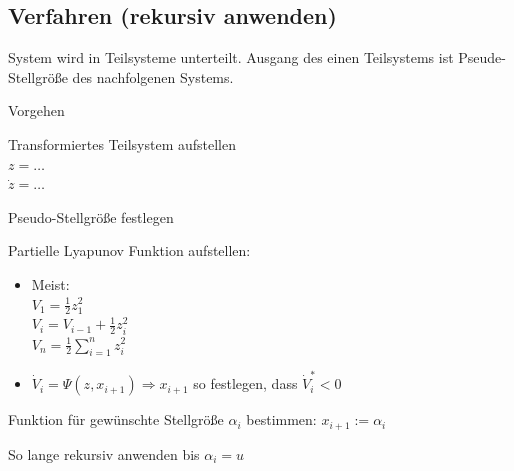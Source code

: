 \documentclass[german]{latex4ei/latex4ei_sheet}
\begin{document}
\begin{sectionbox}
\subsection{Verfahren (rekursiv anwenden)}
System wird in Teilsysteme unterteilt. Ausgang des einen Teilsystems ist Pseude-Stellgröße des nachfolgenen Systems.

\begin{cookbox}{Vorgehen}
  \item Transformiertes Teilsystem aufstellen\\
    $z = \dots$\\
    $\dot{z} = \dots$
  \item Pseudo-Stellgröße festlegen
  \item Partielle Lyapunov Funktion aufstellen:
    \begin{itemize}
      \item  Meist:\\
        $V_1 = \frac{1}{2} z_1^2$\\
        $V_i = V_{i-1} + \frac{1}{2}z_i^2$ \\
        $V_n = \frac{1}{2} \sum\limits_{i=1}^{n} z_i^2$
      \item $\dot{V}_i = \Psi(z, x_{i+1}) \Rightarrow x_{i+1}$ so festlegen, dass $\dot{V}_i^* < 0$
    \end{itemize}
  \item Funktion für gewünschte Stellgröße $\alpha_i$ bestimmen: $x_{i+1} := \alpha_i$
  \item So lange rekursiv anwenden bis $\alpha_i = u$
\end{cookbox}
\end{sectionbox}
\end{document}
